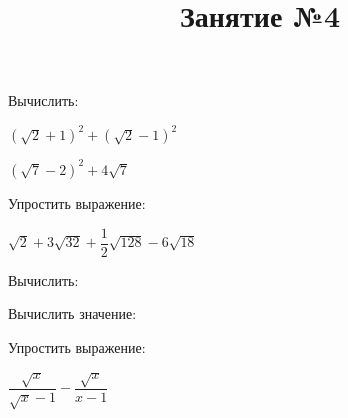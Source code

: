 \title{Занятие №4}
\begin{listofex}
	\item Вычислить:
	\begin{enumcols}[itemcolumns=3]
		\item {}
		\item {}
		\item {}
		\item {}
		\item \( (\sqrt{2}+1)^2+(\sqrt{2}-1)^2 \) 
		\item \( (\sqrt{7}-2)^2+4\sqrt{7} \) 
	\end{enumcols}
	\item Упростить выражение:
	\begin{enumcols}[itemcolumns=2]
		\item \( \sqrt{2}+3\sqrt{32}+\dfrac{1}{2}\sqrt{128}-6\sqrt{18} \) 
		\item {}
		\item {}
	\end{enumcols}
	\item Вычислить:
	\begin{enumcols}[itemcolumns=2]
		\item {}
		\item {}
		\item {}
	\end{enumcols}
	\item Вычислить значение:
	\begin{enumcols}[itemcolumns=2]
		\item {}
		\item {}
		\item {}
	\end{enumcols}
	\item {}
	\item Упростить выражение:
	\begin{enumcols}[itemcolumns=3]
		\item \( \dfrac{\sqrt{x}}{\sqrt{x}-1}-\dfrac{\sqrt{x}}{x-1} \) 

\end{enumcols}
\end{listofex}
